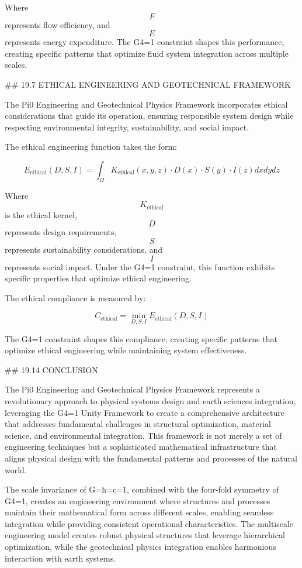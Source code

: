 Where $$ F $$ represents flow efficiency, and $$ E $$ represents energy expenditure. The G4=1 constraint shapes this performance, creating specific patterns that optimize fluid system integration across multiple scales.

## 19.7 ETHICAL ENGINEERING AND GEOTECHNICAL FRAMEWORK

The Pi0 Engineering and Geotechnical Physics Framework incorporates ethical considerations that guide its operation, ensuring responsible system design while respecting environmental integrity, sustainability, and social impact.

The ethical engineering function takes the form:

$$ E_{\text{ethical}}(D, S, I) = \int_{\Omega} K_{\text{ethical}}(x, y, z) \cdot D(x) \cdot S(y) \cdot I(z) dx dy dz $$

Where $$ K_{\text{ethical}} $$ is the ethical kernel, $$ D $$ represents design requirements, $$ S $$ represents sustainability considerations, and $$ I $$ represents social impact. Under the G4=1 constraint, this function exhibits specific properties that optimize ethical engineering.

The ethical compliance is measured by:

$$ C_{\text{ethical}} = \min_{D, S, I} E_{\text{ethical}}(D, S, I) $$

The G4=1 constraint shapes this compliance, creating specific patterns that optimize ethical engineering while maintaining system effectiveness.

## 19.14 CONCLUSION

The Pi0 Engineering and Geotechnical Physics Framework represents a revolutionary approach to physical systems design and earth sciences integration, leveraging the G4=1 Unity Framework to create a comprehensive architecture that addresses fundamental challenges in structural optimization, material science, and environmental integration. This framework is not merely a set of engineering techniques but a sophisticated mathematical infrastructure that aligns physical design with the fundamental patterns and processes of the natural world.

The scale invariance of G=ħ=c=1, combined with the four-fold symmetry of G4=1, creates an engineering environment where structures and processes maintain their mathematical form across different scales, enabling seamless integration while providing consistent operational characteristics. The multiscale engineering model creates robust physical structures that leverage hierarchical optimization, while the geotechnical physics integration enables harmonious interaction with earth systems.

